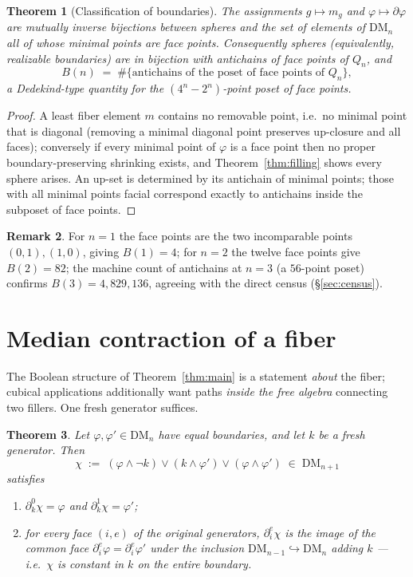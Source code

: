 \documentclass[11pt]{amsart}
\newtheorem{thm}{Theorem}[section]
\theoremstyle{definition}
\newtheorem{rem}[thm]{Remark}
\newcommand{\DM}{\mathrm{DM}}
\newcommand{\lc}{Q}                       %
\newcommand{\bnd}{\partial}
\begin{document}
\begin{thm}[Classification of boundaries]
  \label{thm:boundaries}
  The assignments $g \mapsto m_g$ and $\varphi \mapsto \bnd\varphi$
  are mutually inverse bijections between spheres and the set of
  elements of $\DM_n$ all of whose minimal points are face points.
  Consequently spheres (equivalently, realizable boundaries) are in
  bijection with antichains of face points of $\lc_n$, and
  \[
    B(n) \;=\; \#\{\text{antichains of the poset of face points of }
    \lc_n\},
  \]
  a Dedekind-type quantity for the $(4^n - 2^n)$-point poset of face
  points.
\end{thm}

\begin{proof}
  A least fiber element $m$ contains no removable point, i.e.\ no
  minimal point that is diagonal (removing a minimal diagonal point
  preserves up-closure and all faces); conversely if every minimal
  point of $\varphi$ is a face point then no proper
  boundary-preserving shrinking exists, and
  Theorem~\ref{thm:filling} shows every sphere arises.  An up-set is
  determined by its antichain of minimal points; those with all
  minimal points facial correspond exactly to antichains inside the
  subposet of face points.
\end{proof}

\begin{rem}
  For $n = 1$ the face points are the two incomparable points
  $(0,1), (1,0)$, giving $B(1) = 4$; for $n = 2$ the twelve face
  points give $B(2) = 82$; the machine count of antichains at
  $n = 3$ (a $56$-point poset) confirms $B(3) = 4{,}829{,}136$,
  agreeing with the direct census (\S\ref{sec:census}).
\end{rem}

\section{Median contraction of a fiber}
\label{sec:median}

The Boolean structure of Theorem~\ref{thm:main} is a statement
\emph{about} the fiber; cubical applications additionally want paths
\emph{inside the free algebra} connecting two fillers.  One fresh
generator suffices.

\begin{thm}
  \label{thm:median}
  Let $\varphi, \varphi' \in \DM_n$ have equal boundaries, and let
  $k$ be a fresh generator.  Then
  \[
    \chi \;:=\; (\varphi \wedge \neg k) \vee (k \wedge \varphi')
    \vee (\varphi \wedge \varphi') \;\in\; \DM_{n+1}
  \]
  satisfies
  \begin{enumerate}
  \item $\bnd_k^0 \chi = \varphi$ and $\bnd_k^1 \chi = \varphi'$;
  \item for every face $(i, e)$ of the original generators,
    $\bnd_i^e \chi$ is the image of the common face
    $\bnd_i^e \varphi = \bnd_i^e \varphi'$ under the inclusion
    $\DM_{n-1} \hookrightarrow \DM_{n}$ adding $k$ --- i.e.\ $\chi$
    is constant in $k$ on the entire boundary.
  \end{enumerate}
\end{thm}
\end{document}
